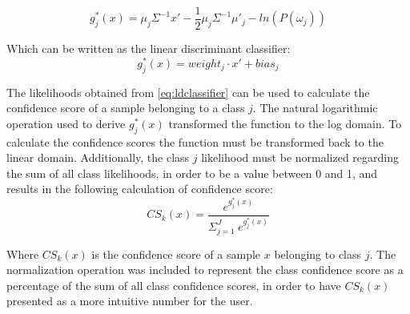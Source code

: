 \begin{equation} 
	g_{j}^{*}(x) = \mu_{j}\varSigma^{-1}x' - \frac{1}{2}\mu_{j}\varSigma^{-1}\mu'_{j} - ln(P(\omega_{j}))
\end{equation}

Which can be written as the linear discriminant classifier:
\vspace{-0.2cm}
\begin{equation} \label{eq:ldclassifier}
	g_{j}^{*}(x) = weight_{j}\cdot x' + bias_{j}
\end{equation}

The likelihoods obtained from \eqref{eq:ldclassifier} can be used to calculate the confidence score of a sample belonging to a class $j$. The natural logarithmic operation used to derive $g_{j}^{*}(x)$ transformed the function to the log domain. To calculate the confidence scores the function must be transformed back to the linear domain. Additionally, the class $j$ likelihood must be normalized regarding the sum of all class likelihoods, in order to be a value between 0 and 1, and results in the following calculation of confidence score:
\vspace{-0.2cm}
\begin{equation}
	CS_{k}(x) = \frac{e^{g^{*}_{j}(x)}}{\Sigma^{J}_{j=1}~e^{g^{*}_{j}(x)}}
\end{equation}

Where $CS_{k}(x)$ is the confidence score of a sample $x$ belonging to class $j$. The normalization operation was included to represent the class confidence score as a percentage of the sum of all class confidence scores, in order to have $CS_{k}(x)$ presented as a more intuitive number for the user.

